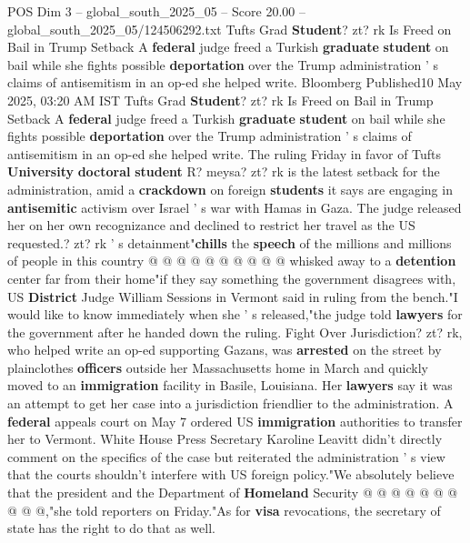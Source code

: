 \begin{textsample}{POS Dim 3 – global\_south\_2025\_05 – Score 20.00 – global\_south\_2025\_05/124506292.txt}  \label{ex:f3_pos_282}
Tufts Grad \textbf{Student}? zt? rk Is Freed on Bail in Trump Setback A \textbf{federal} judge freed a Turkish \textbf{graduate} \textbf{student} on bail while she fights possible \textbf{deportation} over the Trump administration ' s claims of antisemitism in an op-ed she helped write.
Bloomberg Published10 May 2025, 03:20 AM IST Tufts Grad \textbf{Student}? zt? rk Is Freed on Bail in Trump Setback A \textbf{federal} judge freed a Turkish \textbf{graduate} \textbf{student} on bail while she fights possible \textbf{deportation} over the Trump administration ' s claims of antisemitism in an op-ed she helped write.
The ruling Friday in favor of Tufts \textbf{University} \textbf{doctoral} \textbf{student} R? meysa? zt? rk is the latest setback for the administration, amid a \textbf{crackdown} on foreign \textbf{students} it says are engaging in \textbf{antisemitic} activism over Israel ' s war with Hamas in Gaza.
The judge released her on her own recognizance and declined to restrict her travel as the US requested.? zt? rk ' s detainment"\textbf{chills} the \textbf{speech} of the millions and millions of people in this country @ @ @ @ @ @ @ @ @ @ whisked away to a \textbf{detention} center far from their home"if they say something the government disagrees with, US \textbf{District} Judge William Sessions in Vermont said in ruling from the bench."I would like to know immediately when she ' s released,"the judge told \textbf{lawyers} for the government after he handed down the ruling.
Fight Over Jurisdiction? zt? rk, who helped write an op-ed supporting Gazans, was \textbf{arrested} on the street by plainclothes \textbf{officers} outside her Massachusetts home in March and quickly moved to an \textbf{immigration} facility in Basile, Louisiana.
Her \textbf{lawyers} say it was an attempt to get her case into a jurisdiction friendlier to the administration.
A \textbf{federal} appeals court on May 7 ordered US \textbf{immigration} authorities to transfer her to Vermont.
White House Press Secretary Karoline Leavitt didn't directly comment on the specifics of the case but reiterated the administration ' s view that the courts shouldn't interfere with US foreign policy."We absolutely believe that the president and the Department of \textbf{Homeland} Security @ @ @ @ @ @ @ @ @ @,"she told reporters on Friday."As for \textbf{visa} revocations, the secretary of state has the right to do that as well.

\end{textsample}
